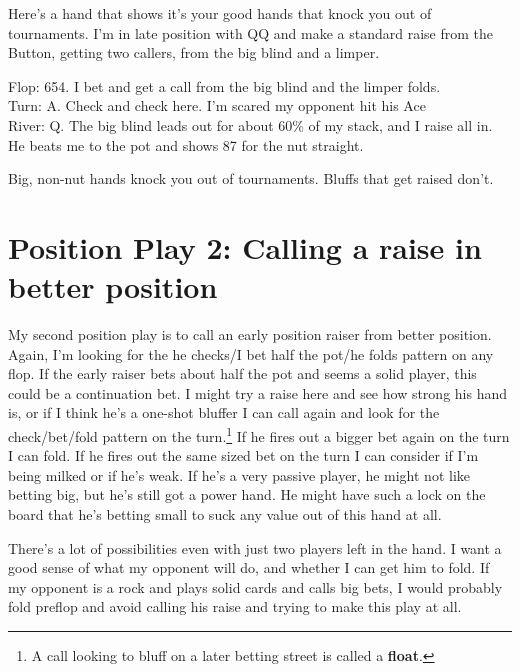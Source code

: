 
Here's a hand that shows it's your good hands that knock you out of tournaments.
I'm in late position with QQ and make a standard raise from the Button,
getting two callers, from the big blind and a limper.

Flop: 654. I bet and get a call from the big blind and the limper folds. \\
Turn: A. Check and check here. I'm scared my opponent hit his Ace \\
River: Q.  The big blind leads out for about 60\% of my stack, and I raise all
in. He beats me to the pot and shows 87 for the nut straight.

Big, non-nut hands knock you out of tournaments. Bluffs that get
raised don't.

\section{Position Play 2: Calling a raise in better position}

My second position play is to call an early position raiser from better
position. Again, I'm looking for the he checks/I bet half the pot/he folds
pattern on any flop. If the early raiser bets about half the
pot and seems a solid player, this could be a continuation bet. I might
try a raise here and see how strong his hand is, or if I think he's a
one-shot bluffer I can call again and look for the check/bet/fold
pattern on the turn.\footnote{A call looking to bluff on a later betting
street is called a \textbf{float}.} If he fires out a bigger bet again
on the turn I
can fold. If he fires out the same sized bet on the turn I can consider if
I'm being milked or if he's weak. If he's a very passive player,
he might not like betting big, but he's still got a power hand. He
might have such a lock on the board that he's betting small to suck
any value out of this hand at all.

There's a lot of possibilities even with just two players left in the hand.
I want a good sense of what my opponent will do, and whether I can
get him to fold. If my opponent is a rock and plays solid cards
and calls big bets, I would probably fold preflop and avoid calling his raise
and trying to make this play at all.

